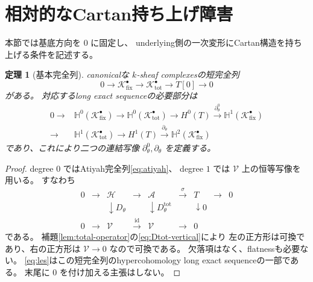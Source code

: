 \documentclass[uplatex,dvipdfmx,11pt]{jsarticle}
\numberwithin{equation}{section}
\theoremstyle{plain}
\newtheorem{theorem}{定理}[section]
\theoremstyle{definition}
\theoremstyle{remark}
\DeclareMathOperator{\id}{id}
\newcommand{\shH}{\mathcal H}
\newcommand{\shA}{\mathcal A}
\newcommand{\shV}{\mathcal V}
\newcommand{\Kfix}{\mathcal K_{\mathrm{fix}}^\bullet}
\newcommand{\Ktot}{\mathcal K_{\mathrm{tot}}^\bullet}
\newcommand{\Dtot}{D_\theta^{\mathrm{tot}}}
\newcommand{\Hyp}{\mathbb H}
\begin{document}
\section{相対的なCartan持ち上げ障害}
\label{sec:relative-obstruction}

本節では基底方向を \(0\) に固定し、
underlying側の一次変形にCartan構造を持ち上げる条件を記述する。


\begin{theorem}[基本完全列]
\label{thm:fundamental-exact-sequence}
canonicalな \(k\)-sheaf complexesの短完全列
\begin{equation}
\label{eq:fundamental-ses}
0\longrightarrow\Kfix\longrightarrow\Ktot\longrightarrow T[0]\longrightarrow0
\end{equation}
がある。
対応するlong exact sequenceの必要部分は
\begin{equation}
\label{eq:les}
\begin{aligned}
0\to{}&\Hyp^0(\Kfix)\to\Hyp^0(\Ktot)\to H^0(T)
\xrightarrow{\ \partial_\theta^0\ }\Hyp^1(\Kfix)\\
\to{}&\Hyp^1(\Ktot)\to H^1(T)
\xrightarrow{\ \partial_\theta\ }\Hyp^2(\Kfix)
\end{aligned}
\end{equation}
であり、これにより二つの連結写像 \(\partial_\theta^0,\partial_\theta\) を定義する。
\end{theorem}

\begin{proof}
degree \(0\) ではAtiyah完全列\eqref{eq:atiyah}、
degree \(1\) では \(\shV\) 上の恒等写像を用いる。
すなわち
\[
\begin{array}{ccccccccc}
0&\to&\shH&\to&\shA&\xrightarrow{\ \sigma\ }&T&\to&0\\
&&\downarrow D_\theta&&\downarrow \Dtot&&\downarrow 0&&\\
0&\to&\shV&\xrightarrow{\ \id\ }&\shV&\to&0&&
\end{array}
\]
である。
補題\ref{lem:total-operator}の\eqref{eq:Dtot-vertical}により
左の正方形は可換であり、右の正方形は \(\shV\to0\) なので可換である。
欠落項はなく、flatnessも必要ない。
\eqref{eq:les}はこの短完全列のhypercohomology long exact sequenceの一部である。
末尾に \(0\) を付け加える主張はしない。
\end{proof}

\end{document}
